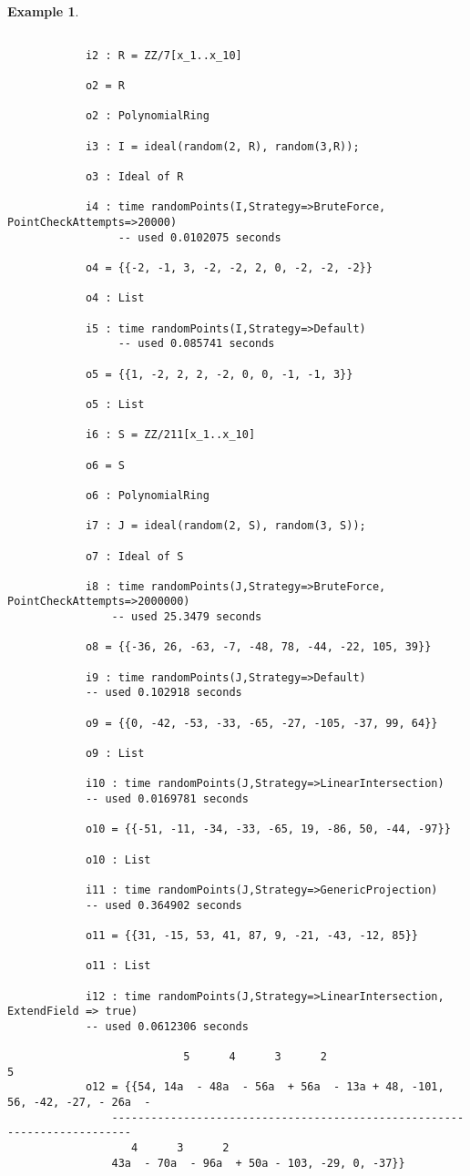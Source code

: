 \documentclass[11pt]{amsart}
\theoremstyle{definition}
\newtheorem{example}{Example}[section]
\begin{document}
	~
	
	\begin{example}
		~~
		
		{{\small\color{blue}
		\begin{verbatim}

			i2 : R = ZZ/7[x_1..x_10]

			o2 = R
			
			o2 : PolynomialRing
			
			i3 : I = ideal(random(2, R), random(3,R));
			
			o3 : Ideal of R
			
			i4 : time randomPoints(I,Strategy=>BruteForce, PointCheckAttempts=>20000)
				 -- used 0.0102075 seconds
			
			o4 = {{-2, -1, 3, -2, -2, 2, 0, -2, -2, -2}}
			
			o4 : List
			
			i5 : time randomPoints(I,Strategy=>Default)
				 -- used 0.085741 seconds
			
			o5 = {{1, -2, 2, 2, -2, 0, 0, -1, -1, 3}}
			
			o5 : List

			i6 : S = ZZ/211[x_1..x_10]

			o6 = S

			o6 : PolynomialRing

			i7 : J = ideal(random(2, S), random(3, S));

			o7 : Ideal of S

			i8 : time randomPoints(J,Strategy=>BruteForce, PointCheckAttempts=>2000000)
				-- used 25.3479 seconds

			o8 = {{-36, 26, -63, -7, -48, 78, -44, -22, 105, 39}}

			i9 : time randomPoints(J,Strategy=>Default)
			-- used 0.102918 seconds
	   
			o9 = {{0, -42, -53, -33, -65, -27, -105, -37, 99, 64}}
			
			o9 : List

			i10 : time randomPoints(J,Strategy=>LinearIntersection)
			-- used 0.0169781 seconds

			o10 = {{-51, -11, -34, -33, -65, 19, -86, 50, -44, -97}}

			o10 : List
			
			i11 : time randomPoints(J,Strategy=>GenericProjection)
			-- used 0.364902 seconds

			o11 = {{31, -15, 53, 41, 87, 9, -21, -43, -12, 85}}

			o11 : List

			i12 : time randomPoints(J,Strategy=>LinearIntersection, ExtendField => true)
     		-- used 0.0612306 seconds

			               5      4      3      2                                      5  
			o12 = {{54, 14a  - 48a  - 56a  + 56a  - 13a + 48, -101, 56, -42, -27, - 26a  -
				-------------------------------------------------------------------------
				   4      3      2
				43a  - 70a  - 96a  + 50a - 103, -29, 0, -37}}
			
	\end{verbatim}
	}}
	\end{example}
\end{document}
